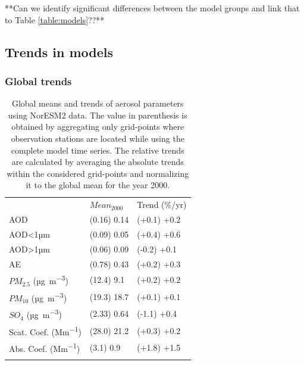 \documentclass[journal abbreviation, manuscript]{copernicus}
\begin{document}
**Can we identify significant differences between the model groups and link that to Table \ref{table:models}??**

\subsection{Trends in models}

\subsubsection{Global trends}

\begin{table}
 \begin{tabular}{lll}
  \tophline
                                & $Mean_{2000}$ & Trend (\%/yr) \\
  \middlehline
  AOD                           & (0.16) 0.14   & (+0.1) +0.2   \\
  AOD<1µm                       & (0.09) 0.05   & (+0.4) +0.6   \\
  AOD>1µm                       & (0.06) 0.09   & (-0.2) +0.1   \\
  AE                            & (0.78) 0.43   & (+0.2) +0.3   \\
  $PM_{2.5}$ (\unit{µg.m^{-3}}) & (12.4) 9.1    & (+0.2) +0.2   \\
  $PM_{10}$ (\unit{µg.m^{-3}})  & (19.3) 18.7   & (+0.1) +0.1   \\
  $SO_{4}$ (\unit{µg.m^{-3}})   & (2.33) 0.64   & (-1.1) +0.4   \\
  Scat. Coef. (\unit{Mm^{-1}})  & (28.0) 21.2   & (+0.3) +0.2   \\
  Abs. Coef. (\unit{Mm^{-1}})   & (3.1) 0.9     & (+1.8) +1.5   \\
  \bottomhline
 \end{tabular}
 \caption{Global means and trends of aerosol parameters using NorESM2 data. The value in parenthesis is obtained by aggregating only grid-points where observation stations are located while using the complete model time series. The relative trends are calculated by averaging the absolute trends within the considered grid-points and normalizing it to the global mean for the year 2000.}
 \label{table:global_trends}
\end{table}
\end{document}
